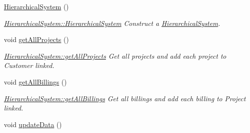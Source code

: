 \begin{DoxyCompactItemize}
\item 
\hypertarget{classUtils_1_1HierarchicalSystem_a55e085ac80ae1640b7fb428f2a5d188c}{}\hyperlink{classUtils_1_1HierarchicalSystem_a55e085ac80ae1640b7fb428f2a5d188c}{Hierarchical\+System} ()\label{classUtils_1_1HierarchicalSystem_a55e085ac80ae1640b7fb428f2a5d188c}

\begin{DoxyCompactList}\small\item\em \hyperlink{classUtils_1_1HierarchicalSystem_a55e085ac80ae1640b7fb428f2a5d188c}{Hierarchical\+System\+::\+Hierarchical\+System} Construct a \hyperlink{classUtils_1_1HierarchicalSystem}{Hierarchical\+System}. \end{DoxyCompactList}\item 
\hypertarget{classUtils_1_1HierarchicalSystem_ae45de757de5b0867d419a4d86e12c94f}{}void \hyperlink{classUtils_1_1HierarchicalSystem_ae45de757de5b0867d419a4d86e12c94f}{get\+All\+Projects} ()\label{classUtils_1_1HierarchicalSystem_ae45de757de5b0867d419a4d86e12c94f}

\begin{DoxyCompactList}\small\item\em \hyperlink{classUtils_1_1HierarchicalSystem_ae45de757de5b0867d419a4d86e12c94f}{Hierarchical\+System\+::get\+All\+Projects} Get all projects and add each project to Customer linked. \end{DoxyCompactList}\item 
\hypertarget{classUtils_1_1HierarchicalSystem_a80b20dd898e0c44741cb4e6768342b72}{}void \hyperlink{classUtils_1_1HierarchicalSystem_a80b20dd898e0c44741cb4e6768342b72}{get\+All\+Billings} ()\label{classUtils_1_1HierarchicalSystem_a80b20dd898e0c44741cb4e6768342b72}

\begin{DoxyCompactList}\small\item\em \hyperlink{classUtils_1_1HierarchicalSystem_a80b20dd898e0c44741cb4e6768342b72}{Hierarchical\+System\+::get\+All\+Billings} Get all billings and add each billing to Project linked. \end{DoxyCompactList}\item 
\hypertarget{classUtils_1_1HierarchicalSystem_af0881e95aef001ee46d9f83a9e66dca5}{}void \hyperlink{classUtils_1_1HierarchicalSystem_af0881e95aef001ee46d9f83a9e66dca5}{update\+Data} ()\label{classUtils_1_1HierarchicalSystem_af0881e95aef001ee46d9f83a9e66dca5}


\end{DoxyCompactItemize}
